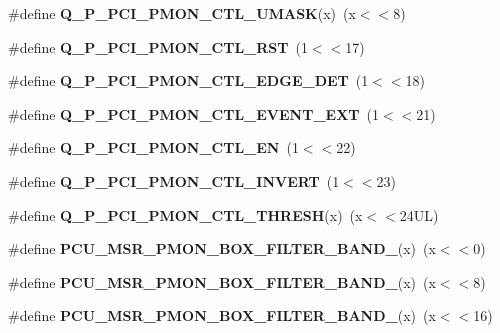 \begin{DoxyCompactItemize}
\item 
\#define {\bfseries Q\+\_\+\+P\+\_\+\+P\+C\+I\+\_\+\+P\+M\+O\+N\+\_\+\+C\+T\+L\+\_\+\+U\+M\+A\+S\+K}(x)~(x$<$$<$8)\label{types_8h_adb49550b5c697b728cca4761126f41d7}

\item 
\#define {\bfseries Q\+\_\+\+P\+\_\+\+P\+C\+I\+\_\+\+P\+M\+O\+N\+\_\+\+C\+T\+L\+\_\+\+R\+S\+T}~(1$<$$<$17)\label{types_8h_abc1887d2528818b68ba13e34d5a575a1}

\item 
\#define {\bfseries Q\+\_\+\+P\+\_\+\+P\+C\+I\+\_\+\+P\+M\+O\+N\+\_\+\+C\+T\+L\+\_\+\+E\+D\+G\+E\+\_\+\+D\+E\+T}~(1$<$$<$18)\label{types_8h_a129f0786cdfaa6d9a5aa7ae2340ae2ba}

\item 
\#define {\bfseries Q\+\_\+\+P\+\_\+\+P\+C\+I\+\_\+\+P\+M\+O\+N\+\_\+\+C\+T\+L\+\_\+\+E\+V\+E\+N\+T\+\_\+\+E\+X\+T}~(1$<$$<$21)\label{types_8h_a6f393387567839622066d15c749ae1d5}

\item 
\#define {\bfseries Q\+\_\+\+P\+\_\+\+P\+C\+I\+\_\+\+P\+M\+O\+N\+\_\+\+C\+T\+L\+\_\+\+E\+N}~(1$<$$<$22)\label{types_8h_ab0ea8d2d83fd6ac529248e1374dbdf3c}

\item 
\#define {\bfseries Q\+\_\+\+P\+\_\+\+P\+C\+I\+\_\+\+P\+M\+O\+N\+\_\+\+C\+T\+L\+\_\+\+I\+N\+V\+E\+R\+T}~(1$<$$<$23)\label{types_8h_abdb99ce46d65242a12d5b9d7320be907}

\item 
\#define {\bfseries Q\+\_\+\+P\+\_\+\+P\+C\+I\+\_\+\+P\+M\+O\+N\+\_\+\+C\+T\+L\+\_\+\+T\+H\+R\+E\+S\+H}(x)~(x$<$$<$24\+U\+L)\label{types_8h_a519775439b97120154571709922c5129}

\item 
\#define {\bfseries P\+C\+U\+\_\+\+M\+S\+R\+\_\+\+P\+M\+O\+N\+\_\+\+B\+O\+X\+\_\+\+F\+I\+L\+T\+E\+R\+\_\+\+B\+A\+N\+D\+\_}(x)~(x$<$$<$0)\label{types_8h_ad803a7d37decfd980f61c179c5b1a3cd}

\item 
\#define {\bfseries P\+C\+U\+\_\+\+M\+S\+R\+\_\+\+P\+M\+O\+N\+\_\+\+B\+O\+X\+\_\+\+F\+I\+L\+T\+E\+R\+\_\+\+B\+A\+N\+D\+\_}(x)~(x$<$$<$8)\label{types_8h_ac03367f3dad1f3ead4d9ad72d399247d}

\item 
\#define {\bfseries P\+C\+U\+\_\+\+M\+S\+R\+\_\+\+P\+M\+O\+N\+\_\+\+B\+O\+X\+\_\+\+F\+I\+L\+T\+E\+R\+\_\+\+B\+A\+N\+D\+\_}(x)~(x$<$$<$16)\label{types_8h_aace8b49d5adbd42496512163acec16a1}


\end{DoxyCompactItemize}
